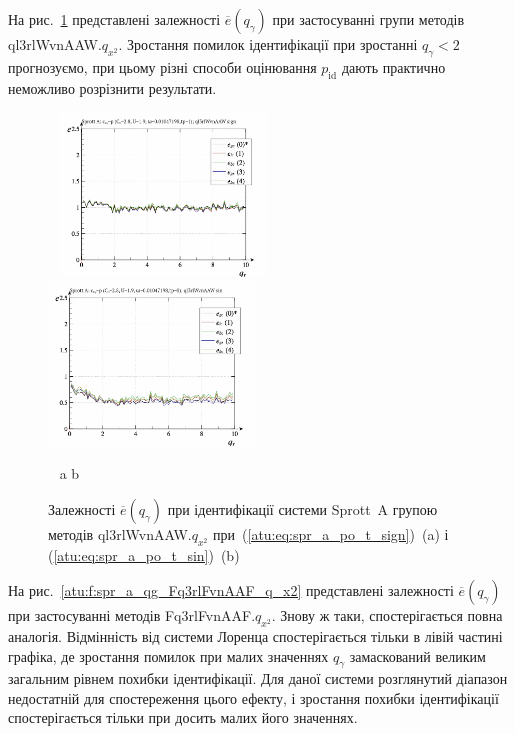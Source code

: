 На рис.~\ref{atu:f:spr_a_ql3rlWvnAAW_q_x2} представлені залежності
$\overline{e} (q_\gamma)$ при застосуванні групи методів ql3rlWvnAAW.$q_{x^2}$.
Зростання помилок ідентифікації при зростанні
$q_\gamma <2$ прогнозуємо, при цьому різні способи оцінювання
$p_\mathrm{id}$ дають практично неможливо розрізнити результати.

\begin{figure}[htb!]
\begin{center}
  ~ \hfill
    \includegraphics[width=0.49\textwidth]{p/cha/spr_a/ql3rlWvnAAW_x2/sprott_a_id-p_q_gamma_sign.png}
    \hfill
    \includegraphics[width=0.49\textwidth]{p/cha/spr_a/ql3rlWvnAAW_x2/sprott_a_id-p_q_gamma_sin.png}
  \hfill ~
\end{center}
  \vspace{-1.0ex}
  \begin{center}
    ~ \hfill a \hfill\hfill b \hfill ~
  \end{center}
  \caption{Залежності $\overline{e} (q_\gamma)$ при ідентифікації системи Sprott~A групою методів ql3rlWvnAAW.$q_{x^2}$ при~(\ref{atu:eq:spr_a_po_t_sign})~(a) і (\ref{atu:eq:spr_a_po_t_sin})~(b)}
  \label{atu:f:spr_a_ql3rlWvnAAW_q_x2}
\end{figure}

На рис.~\ref{atu:f:spr_a_qg_Fq3rlFvnAAF_q_x2} представлені залежності
$\overline{e} (q_\gamma)$ при застосуванні методів Fq3rlFvnAAF.$q_{x^2}$.
Знову ж таки, спостерігається повна
аналогія. Відмінність від системи Лоренца спостерігається
тільки в лівій частині графіка, де зростання помилок при малих
значеннях
$q_\gamma$ замаскований великим загальним рівнем похибки
ідентифікації. Для даної системи розглянутий діапазон
недостатній для спостереження цього ефекту, і зростання похибки
ідентифікації спостерігається тільки при досить малих його
значеннях.

